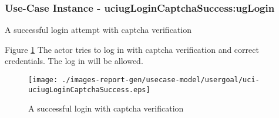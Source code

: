 
	\subsubsection{Use-Case Instance - uciugLoginCaptchaSuccess:ugLogin}
	
	A successful login attempt with captcha verification		  
	\begin{operationmodel}
	
	\end{operationmodel} 

	
	Figure \ref{fig:lu.uni.lassy.excalibur.examples.icrash-RE-UC-uci-uciugLoginCaptchaSuccess}
	The actor tries to log in with captcha verification and correct credentials. The log in will be allowed.
	
	\begin{figure}[htbp]
	\begin{center}
	
	\texttt{[image: ./images-report-gen/usecase-model/usergoal/uci-uciugLoginCaptchaSuccess.eps]}
	\end{center}
	\caption[lu.uni.lassy.excalibur.examples.icrash Sequence Diagram: uci-uciugLoginCaptchaSuccess]{A successful login with captcha verification}
	\label{fig:lu.uni.lassy.excalibur.examples.icrash-RE-UC-uci-uciugLoginCaptchaSuccess}
	\end{figure}
	\vspace{0.5cm}
